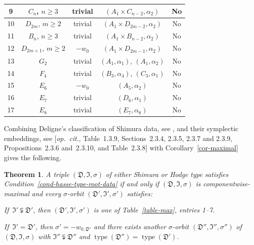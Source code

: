 \documentclass[11pt]{amsart}
\numberwithin{equation}{section}
\newtheorem{theorem}{Theorem}[section]
\theoremstyle{definition}
\theoremstyle{remark}
\newcommand{\Dfr}{{\mathfrak D}}
\newcommand{\Ifr}{{\mathfrak I}}
\newcommand{\opcitn}{{\em op.\ cit.}}
\DeclareMathOperator{\type}{type}
\begin{document}
\begin{table}[ht]
\begin{center}
\begin{tabular}{|c|c|c|c|c|}
\\ \hline 
9 &
$C_n$, $n \geq 3$ & trivial & 
$(A_1 \times C_{n-2}, \alpha_2)$
& No


\\ \hline 
10 &
 $D_{2m}$, $m \geq 2$  & trivial &  $(A_1 \times D_{2m-2}, \alpha_2)$ 
& No
\\ \hline 
11 &
$B_n$, $n \geq 3$ & trivial & $(A_1 \times B_{n-2}, \alpha_2)$ 
& No


 \\ \hline 
12 &
 $D_{2m+1}$, $m \geq 2$  & $-w_0$ & $(A_1 \times D_{2m-1}, \alpha_2)$ 
& No


 \\ \hline 
13 &
$G_2$ & trivial & $(A_1, \alpha_1)$, $(A_1, \alpha_2)$
   
& No

\\ \hline 
14 &
$F_4$ &  trivial &
$(B_3, \alpha_4)$, $(C_3, \alpha_1)$
  
& No

\\ \hline 
15 &
$E_6$ &  $-w_0$ &
 $(A_5, \alpha_2)$
& No

\\ \hline 
16 &
$E_7$ &  trivial &
  $(D_6, \alpha_1)$       & No
 
\\ \hline 
17 &
$E_8$ &  trivial &
$(E_7,\alpha_8)$       & No
 
\\ \hline
   \end{tabular}
\end{center}
\end{table}


Combining Deligne's classification of Shimura data, see \cite[Section~1.2.5]{Deligne-Shimura-varieties}, and their symplectic embeddings, see [\opcitn, Table~1.3.9, Sections~2.3.4, 2.3.5, 2.3.7 and 2.3.9, Propositions~2.3.6 and~2.3.10, and Table~2.3.8]  with Corollary~\ref{cor-maximal} gives the following. 

\begin{theorem}
\label{th-Hodge}
A triple $(\Dfr, \Ifr, \sigma)$ of either Shimura or Hodge type satisfies Condition~\ref{cond-hasse-type-root-data} if and only if $(\Dfr, \Ifr, \sigma)$ is componentwise-maximal and every $\sigma$-orbit $(\Dfr', \Ifr', \sigma')$ satisfies:
\begin{alist}
\item
\label{item-special-shimura}
If\, $\Ifr' \subsetneqq \Dfr'$, then $(\Dfr', \Ifr', \sigma')$ is one of Table~\ref{table-max}, entries 1--7.
 
\item 
\label{item-cpt-factors}
 If\, $\Ifr'=\Dfr'$, then $\sigma'=-w_{0,\Dfr'}$ and there exists another $\sigma$-orbit $(\Dfr'', \Ifr'', \sigma'')$ of\, $(\Dfr, \Ifr, \sigma)$ with $\Ifr'' \subsetneqq \Dfr''$ and $\type(\Dfr'')=\type(\Dfr')$.    
\end{alist}
\end{theorem}
\end{document}
